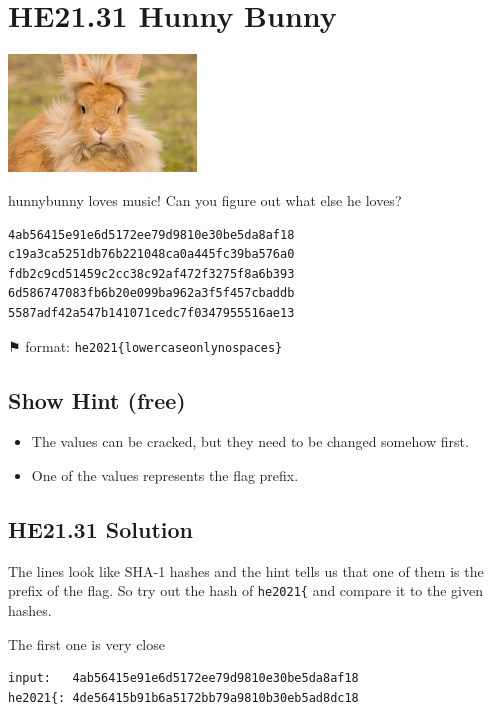 \documentclass[english,a4paper,nols,noindent]{tufte-handout}
\begin{document}
\hypertarget{he21.31}{%
\section{HE21.31 Hunny Bunny}
  \label{he21.31}}
\begin{marginfigure}
    \includegraphics[width=50mm]{images/challenge31.jpg}
\end{marginfigure}

\noindent hunnybunny loves music! Can you figure out what else he loves?

\begin{verbatim}
4ab56415e91e6d5172ee79d9810e30be5da8af18
c19a3ca5251db76b221048ca0a445fc39ba576a0
fdb2c9cd51459c2cc38c92af472f3275f8a6b393
6d586747083fb6b20e099ba962a3f5f457cbaddb
5587adf42a547b141071cedc7f0347955516ae13
\end{verbatim}

{\NotoSymbol ⚑} format: \verb+he2021{lowercaseonlynospaces}+

\subsection{Show Hint (free)}
\begin{itemize}
\item The values can be cracked, but they need to be changed somehow first.
\item One of the values represents the flag prefix.
\end{itemize}

\hypertarget{he21.31-solution}{%
\subsection{HE21.31 Solution}\label{he21.31-solution}}

\noindent The lines look like SHA-1 hashes and the hint tells us that one of
them is the prefix of the flag.  So try out the hash of \verb+he2021{+ and
compare it to the given hashes.

The first one is very close

\begin{verbatim} 
input:   4ab56415e91e6d5172ee79d9810e30be5da8af18
he2021{: 4de56415b91b6a5172bb79a9810b30eb5ad8dc18
\end{verbatim} 
\end{document}
